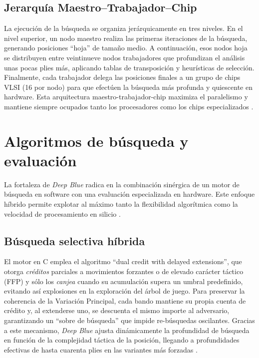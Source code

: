 \documentclass[a4paper, 12pt]{article}
\begin{document}
\subsection{Jerarquía Maestro--Trabajador--Chip}


La ejecución de la búsqueda se organiza jerárquicamente en tres 
niveles. En el nivel superior, un nodo maestro realiza las 
primeras iteraciones de la búsqueda, generando posiciones 
“hoja” de tamaño medio. A continuación, esos nodos hoja se 
distribuyen entre veintinueve nodos trabajadores que profundizan 
el análisis unas pocas plies más, aplicando tablas de 
transposición y heurísticas de selección. Finalmente, cada 
trabajador delega las posiciones finales a un grupo de chips 
VLSI (16 por nodo) para que efectúen la búsqueda más profunda y 
quiescente en hardware. Esta arquitectura maestro-trabajador-chip 
maximiza el paralelismo y mantiene siempre ocupados tanto los 
procesadores como los chips especializados \cite{Campbell2002, hsu1999ibm}.










\section{Algoritmos de búsqueda y evaluación}

La fortaleza de \textit{Deep Blue} radica en la combinación 
sinérgica de un motor de búsqueda en software con una evaluación 
especializada en hardware. Este enfoque híbrido permite 
explotar al máximo tanto la flexibilidad algorítmica como la 
velocidad de procesamiento en silicio \cite{campbell1999search}.

\subsection{Búsqueda selectiva híbrida}

El motor en C emplea el algoritmo “dual credit with delayed 
extensions”, que otorga \emph{créditos} parciales a movimientos 
forzantes o de elevado carácter táctico (FFP) y sólo los 
\emph{canjea} cuando su acumulación supera un umbral predefinido, 
evitando así explosiones en la exploración del árbol de juego. 
Para preservar la coherencia de la 
Variación Principal, cada bando mantiene su propia cuenta de 
crédito y, al extenderse uno, se descuenta el mismo importe al 
adversario, garantizando un “sobre de búsqueda” que impide 
re-búsquedas oscilantes. Gracias a este 
mecanismo, \textit{Deep Blue} ajusta dinámicamente la 
profundidad de búsqueda en función de la complejidad táctica de 
la posición, llegando a profundidades efectivas de hasta 
cuarenta plies en las variantes más forzadas \cite{campbell1999search}.
\end{document}

